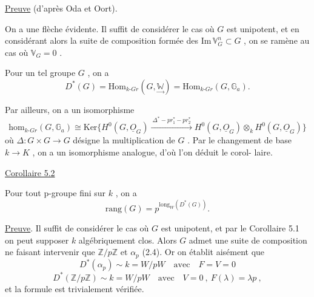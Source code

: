 
\uline{Preuve} (d'après Oda et Oort).

On a une flèche évidente. Il suffit de considérer le cas où
$G$ est unipotent, et en considérant alors la suite de composition formée
des $\mathrm{Im}\,\mathbb{V}^n_G \subset G$ , on se ramène au cas où $\mathbb{V}_G = 0$ .

Pour un tel groupe $G$ , on a
\[ D^*(G) = \mathrm{Hom}_{k\text{-}Gr}(G,\underset{\to}{\mathbb{W}}) = \mathrm{Hom}_{k\text{-}Gr}(G,\mathbb{G}_a) . \]

Par ailleurs, on a un isomorphisme
\[ \mathrm{hom}_{k\text{-}Gr}(G,\mathbb{G}_a) \cong \mathrm{Ker}\{H^0(G,\underline{O}_G) \xrightarrow{\ \Delta^*-pr_1^*-pr_2^*\ } H^0(G,\underline{O}_G) \otimes_k H^0(G,\underline{O}_G)\} \]
où $\Delta : G \times G \to G$ désigne la multiplication de $G$ . Par le changement de
base $k \to K$ , on a un isomorphisme analogue, d'où l'on déduit le corol-%
laire.

\uline{Corollaire 5.2}

Pour tout p-groupe fini sur $k$ , on a
\[ \mathrm{rang}(G) = p^{\mathrm{long}_W(D^*(G))} . \]

\uline{Preuve}. Il suffit de considérer le cas où $G$ est unipotent, et par le
Corollaire 5.1 on peut supposer $k$ algébriquement clos. Alors $G$ admet
une suite de composition ne faisant intervenir que $\mathbb{Z}/p\mathbb{Z}$ et $\alpha_p$ (2.4).
Or on établit aisément que
\[ D^*(\alpha_p) \sim k = W/pW \quad \text{avec} \quad F = V = 0 \]
\[ D^*(\mathbb{Z}/p\mathbb{Z}) \sim k = W/pW \quad \text{avec} \quad V = 0 \ , \ F(\lambda) = \lambda p \ , \]
et la formule est trivialement vérifiée.

